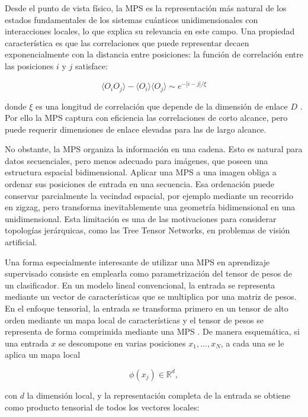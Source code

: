 Desde el punto de vista físico, la MPS es la representación más natural de los estados fundamentales de los sistemas cuánticos unidimensionales con interacciones locales, lo que explica su relevancia en este campo. Una propiedad característica es que las correlaciones que puede representar decaen exponencialmente con la distancia entre posiciones: la función de correlación entre las posiciones $i$ y $j$ satisface:

\begin{equation}
  \langle O_i O_j \rangle - \langle O_i \rangle \langle O_j \rangle \sim e^{-|i-j|/\xi}   
\end{equation}

donde $\xi$ es una longitud de correlación que depende de la dimensión de enlace $D$ . Por ello la MPS captura con eficiencia las correlaciones de corto alcance, pero puede requerir dimensiones de enlace elevadas para las de largo alcance.

No obstante, la MPS organiza la información en una cadena. Esto es natural para datos secuenciales, pero menos adecuado para imágenes, que poseen una estructura espacial bidimensional. Aplicar una MPS a una imagen obliga a ordenar sus posiciones de entrada en una secuencia. Esa ordenación puede conservar parcialmente la vecindad espacial, por ejemplo mediante un recorrido en zigzag, pero transforma inevitablemente una geometría bidimensional en una unidimensional. Esta limitación es una de las motivaciones para considerar topologías jerárquicas, como las Tree Tensor Networks, en problemas de visión artificial.

Una forma especialmente interesante de utilizar una MPS en aprendizaje supervisado consiste en emplearla como parametrización del tensor de pesos de un clasificador. En un modelo lineal convencional, la entrada se representa mediante un vector de características que se multiplica por una matriz de pesos. En el enfoque tensorial, la entrada se transforma primero en un tensor de alto orden mediante un mapa local de características y el tensor de pesos se representa de forma comprimida mediante una MPS . De manera esquemática, si una entrada $x$ se descompone en varias posiciones $x_1,\ldots,x_N$, a cada una se le aplica un mapa local

\[ \phi(x_j) \in \mathbb{R}^{d}, \]

con $d$ la dimensión local, y la representación completa de la entrada se obtiene como producto tensorial de todos los vectores locales:

